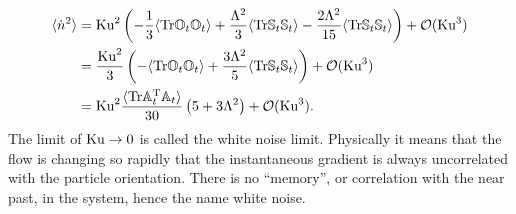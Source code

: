 \documentclass[thesis.tex]{subfiles}
\begin{document}
\begin{align*}
	\langle \dot n^2\rangle &=\mbox{Ku}^2 \left(-\frac{1}{3}\langle\mbox{Tr}\mathbb{O}_t\mathbb{O}_t\rangle +  \frac{\Lambda^2}{3}\langle\mbox{Tr}\mathbb{S}_t \mathbb{S}_t\rangle - \frac{2\Lambda^2}{15}\langle\mbox{Tr}\mathbb{S}_t\mathbb{S}_t \rangle\right) + \mathcal O(\mbox{Ku}^3)  \\
	&= \frac{\mbox{Ku}^2}{3}\left(-\langle\mbox{Tr}\mathbb{O}_t\mathbb{O}_t\rangle +  \frac{3\Lambda^2}{5}\langle\mbox{Tr}\mathbb{S}_t \mathbb{S}_t\rangle\right) + \mathcal O(\mbox{Ku}^3)  \\
	&= \mbox{Ku}^2\frac{\langle\mbox{Tr}\mathbb{A}_t^{\mathrm T} \mathbb{A}_t\rangle}{30}\left(5 + 3 \Lambda^2\right)+ \mathcal O(\mbox{Ku}^3).  
\end{align*}
The limit of $\mbox{Ku}\to0$ is called the white noise limit. Physically it means that the flow is changing so rapidly that the instantaneous gradient is always uncorrelated with the particle orientation. There is no ``memory'', or correlation with the near past, in the system, hence the name white noise.
\end{document}
